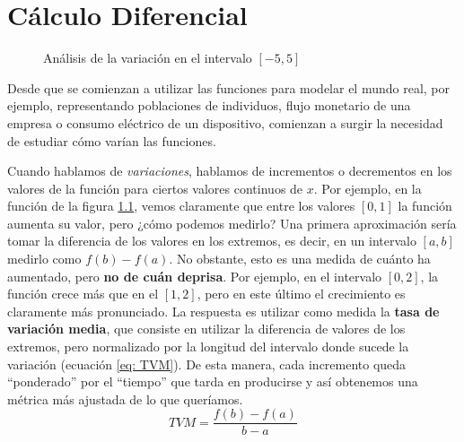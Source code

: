 \documentclass[10pt,a4paper,openright]{book}
\theoremstyle{break}
\begin{document}
\chapter{Cálculo Diferencial}
\begin{figure}[b]
	\centering
	\caption{Análisis de la variación en el intervalo $[-5, 5]$}
	\label{fig: analisis_variacion}
\end{figure}

Desde que se comienzan a utilizar las funciones para modelar el mundo real, por ejemplo, representando poblaciones de individuos, flujo monetario de una empresa o consumo eléctrico de un dispositivo, comienzan a surgir la necesidad de estudiar cómo varían las funciones.

Cuando hablamos de \textit{variaciones}, hablamos de incrementos o decrementos en los valores de la función para ciertos valores continuos de $x$. Por ejemplo, en la función de la figura \ref{fig: analisis_variacion}, vemos claramente que entre los valores $[0, 1]$ la función aumenta su valor, pero ¿cómo podemos medirlo? Una primera aproximación sería tomar la diferencia de los valores en los extremos, es decir, en un intervalo $[a,b]$ medirlo como $f(b)-f(a)$. No obstante, esto es una medida de cuánto ha aumentado, pero \textbf{no de cuán deprisa}. Por ejemplo, en el intervalo $[0,2]$, la función crece más que en el $[1,2]$, pero en este último el crecimiento es claramente más pronunciado. La respuesta es utilizar como medida la \textbf{tasa de variación media}, que consiste en utilizar la diferencia de valores de los extremos, pero normalizado por la longitud del intervalo donde sucede la variación (ecuación \ref{eq: TVM}). De esta manera, cada incremento queda ``ponderado'' por el ``tiempo'' que tarda en producirse y así obtenemos una métrica más ajustada de lo que queríamos.
\begin{equation}
	\label{eq: TVM}
	TVM = \frac{f(b) - f(a)}{b - a}
\end{equation}
\end{document}
